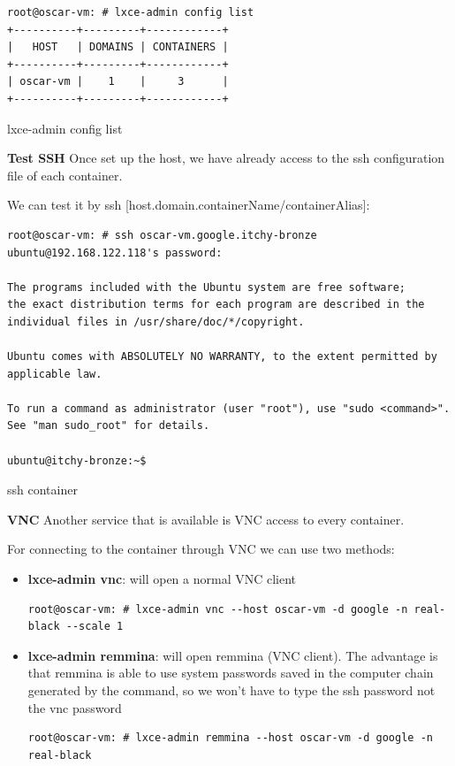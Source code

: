 \begin{listing}[H]
\begin{verbatim}
root@oscar-vm: # lxce-admin config list
+----------+---------+------------+
|   HOST   | DOMAINS | CONTAINERS |
+----------+---------+------------+
| oscar-vm |    1    |     3      |
+----------+---------+------------+
\end{verbatim}
\caption[lxce-admin config list]{\footnotesize{lxce-admin config list}}
\end{listing}

\newpage
\textbf{Test SSH}
Once set up the host, we have already access to the ssh configuration file of each container.

We can test it by ssh [host.domain.containerName/containerAlias]:
\begin{listing}[H]
\begin{verbatim}
root@oscar-vm: # ssh oscar-vm.google.itchy-bronze
ubuntu@192.168.122.118's password:

The programs included with the Ubuntu system are free software;
the exact distribution terms for each program are described in the
individual files in /usr/share/doc/*/copyright.

Ubuntu comes with ABSOLUTELY NO WARRANTY, to the extent permitted by
applicable law.

To run a command as administrator (user "root"), use "sudo <command>".
See "man sudo_root" for details.

ubuntu@itchy-bronze:~$
\end{verbatim}
\caption[ssh container]{\footnotesize{ssh container}}
\end{listing}

\textbf{VNC}
Another service that is available is VNC access to every container.

For connecting to the container through VNC we can use two methods:
\begin{itemize}
	\item{\textbf{lxce-admin vnc}: will open a normal VNC client}
\begin{verbatim}
root@oscar-vm: # lxce-admin vnc --host oscar-vm -d google -n real-black --scale 1
\end{verbatim}
	\item{\textbf{lxce-admin remmina}: will open remmina (VNC client). The advantage is that remmina is able to use system passwords saved in the computer chain generated by the command, so we won't have to type the ssh password not the vnc password}
\begin{verbatim}
root@oscar-vm: # lxce-admin remmina --host oscar-vm -d google -n real-black
\end{verbatim}
\end{itemize}


